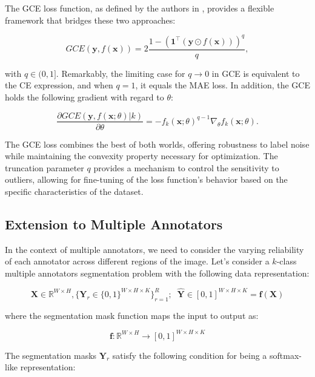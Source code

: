 The GCE loss function, as defined by the authors in
\cite{ZhangEtAl2018}, provides a flexible framework that bridges
these two approaches:

\begin{equation}
  GCE(\mathbf{y}, f(\mathbf{x})) = 2\frac{1 -
  (\mathbf{1}^\top(\mathbf{y} \odot f(\mathbf{x})))^q}{q},
\end{equation}

with $q \in (0,1]$. Remarkably, the limiting case for $q \to 0$ in
GCE is equivalent to the CE expression, and when $q = 1$, it equals
the MAE loss. In addition, the GCE holds the following gradient with
regard to $\theta$:

\begin{equation}
  \frac{\partial GCE(\mathbf{y}, f(\mathbf{x};\theta)|k)}{\partial
  \theta} = -f_k(\mathbf{x};\theta)^{q-1}\nabla_\theta f_k(\mathbf{x};\theta).
\end{equation}

The GCE loss combines the best of both worlds, offering robustness to
label noise while maintaining the convexity property necessary for
optimization. The truncation parameter $q$ provides a mechanism to
control the sensitivity to outliers, allowing for fine-tuning of the
loss function's behavior based on the specific characteristics of the dataset.

\subsection{Extension to Multiple Annotators}

In the context of multiple annotators, we need to consider the
varying reliability of each annotator across different regions of the
image. Let's consider a $k$-class multiple annotators segmentation
problem with the following data representation:

\begin{equation}
  \mathbf X \in \mathbb{R}^{W \times H}, \{ \mathbf Y_r \in
  \{0,1\}^{W \times H \times K} \}_{r=1}^R; \;\; \hat{\mathbf { Y}} \in
  [0,1]^{W\times H \times K} = \mathbf{f}(\mathbf X)
\end{equation}

where the segmentation mask function maps the input to output as:

\begin{equation}
  \mathbf f: \mathbb  R ^{W\times H} \to [0,1]^{W\times H\times K}
\end{equation}

The segmentation masks $\mathbf Y_r$ satisfy the following condition
for being a softmax-like representation:

